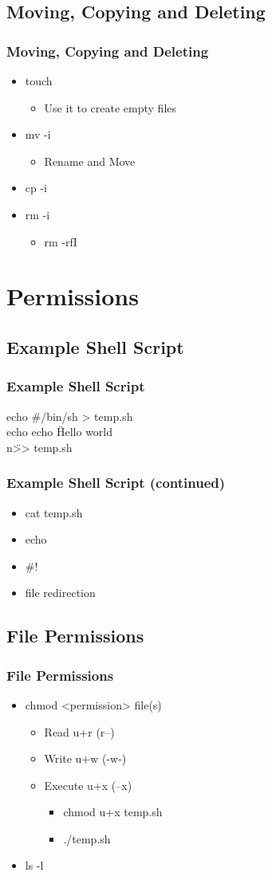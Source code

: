 \documentclass[hyperref={pdfpagelabels=false}]{beamer}
\begin{document}
\subsection{Moving, Copying and Deleting}
\frame
{
    \frametitle{Moving, Copying and Deleting}
    \begin{itemize}
    \item{touch}
        \begin{itemize}
        \item{Use it to create empty files}
        \end{itemize}
    \item{mv -i}
	\begin{itemize}
        \item{Rename and Move}
        \end{itemize}
    \item{cp -i}
    \item{rm -i}
	\begin{itemize}
        \item{rm -rfI}
        \end{itemize}
    \end{itemize}
}
\section{Permissions}
\subsection{Example Shell Script}
\frame
{	
    \frametitle{Example Shell Script}
    echo \#\!/bin/sh > temp.sh \\
    echo echo \"Hello world\!\\n\" >> temp.sh
}
\frame
{
    \frametitle{Example Shell Script (continued)}
    \begin{itemize}
    \item{cat temp.sh}
    \item{echo}
    \item{#!}
    \item{file redirection}
    \end{itemize}

}
\subsection{File Permissions}
\frame
{
    \frametitle{File Permissions}
    \begin{itemize}
    \item{chmod <permission> file(s)}
        \begin{itemize}
        \item{Read u+r (r--)}
        \item{Write u+w (-w-)}
        \item{Execute u+x (--x)}
            \begin{itemize}
            \item{chmod u+x temp.sh}
            \item{./temp.sh}
            \end{itemize}
        \end{itemize}
    \item{ls -l}
    \end{itemize}
}
\end{document}
